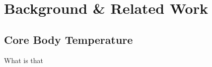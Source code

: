 
\chapter{Background \& Related Work}
\label{ch:Background}

\section{Core Body Temperature}

What is that \cite{chenInearThermometerWearable2020}